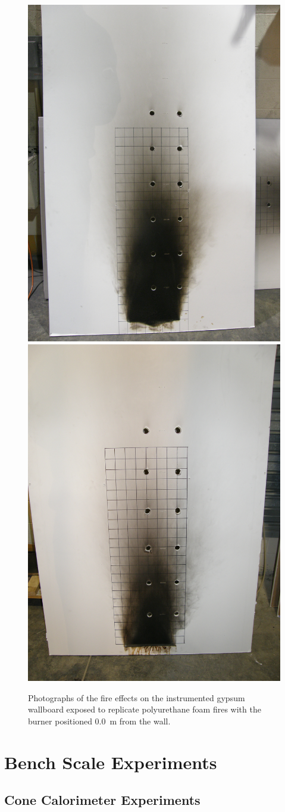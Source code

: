 \documentclass[twoside]{uocthesis}
\begin{document}
\begin{figure}[p]
	\centering
	\includegraphics[trim=5.0in 1.7in 5.0in 15.0in, clip=true, width=0.4\columnwidth]{../Figures/IWGB_PUF8_0m_pattern2}
	\includegraphics[trim=5.0in 3.5in 5.0in 13.0in, clip=true, width=0.4\columnwidth]{../Figures/IWGB_PUF9_0m_pattern} \\
	\caption[Photographs of the fire effects on the instrumented gypsum wallboard exposed to replicate polyurethane foam fires]{Photographs of the fire effects on the instrumented gypsum wallboard exposed to replicate polyurethane foam fires with the burner positioned 0.0~m from the wall.}
	\label{IWGB_PUF_0m_patterns}
\end{figure}

\chapter{Bench Scale Experiments}

\section{Cone Calorimeter Experiments}
\end{document}
